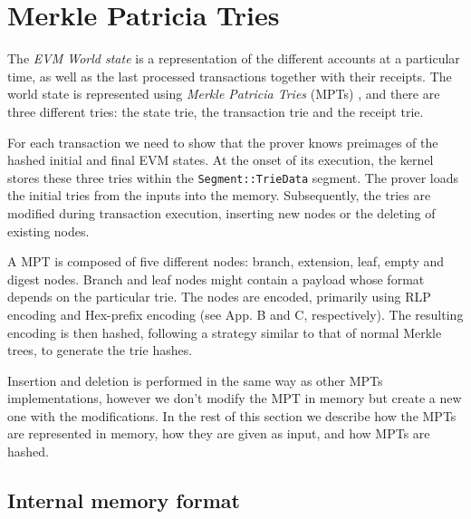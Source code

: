 \section{Merkle Patricia Tries}
\label{tries}
The \emph{EVM World state} is a representation of the different accounts at a particular time, as well as the last processed transactions together with their receipts. The world state is represented using \emph{Merkle Patricia Tries} (MPTs) \cite[App.~D]{yellowpaper}, and there are three different tries: the state trie, the transaction trie and the receipt trie.

For each transaction we need to show that the prover knows preimages of the hashed initial and final EVM states.  At the onset of its execution, the kernel stores these three tries within the {\tt Segment::TrieData} segment. The prover loads the initial tries from the inputs into the memory. Subsequently, the tries are modified during transaction execution, inserting new nodes or the deleting of existing nodes. 

A MPT is composed of five different nodes: branch, extension, leaf, empty and digest nodes. Branch and leaf nodes might contain a payload whose format depends on the particular trie. The nodes are encoded, primarily using RLP encoding and Hex-prefix encoding (see \cite{yellowpaper} App. B and C, respectively). The resulting encoding is then hashed, following a strategy similar to that of normal Merkle trees, to generate the trie hashes.

Insertion and deletion is performed in the same way as other MPTs implementations, however we don't modify the MPT in memory but create a new one with the modifications. In the rest of this section we describe how the MPTs are represented in memory, how they are given as input, and how MPTs are hashed.

\subsection{Internal memory format}

